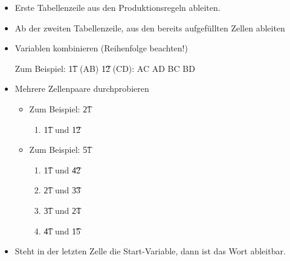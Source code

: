 \documentclass{lehramt-informatik-haupt}
\begin{document}
\begin{itemize}

\item Erste Tabellenzeile aus den Produktionsregeln ableiten.

\item Ab der zweiten Tabellenzeile, aus den bereits aufgefüllten Zellen
ableiten

\item Variablen kombinieren (Reihenfolge beachten!)

Zum Beispiel: \t11 (AB) \t12 (CD): AC AD BC BD

\item Mehrere Zellenpaare durchprobieren

\begin{itemize}
\item Zum Beispiel: \t21

\begin{enumerate}
\item \t11 und \t12
\end{enumerate}

\item Zum Beispiel: \t51

\begin{enumerate}
\item \t11 und \t42
\item \t21 und \t33
\item \t31 und \t24
\item \t41 und \t15
\end{enumerate}
\end{itemize}

\item Steht in der letzten Zelle die Start-Variable, dann ist das Wort
ableitbar.

\end{itemize}


\literatur
\end{document}

